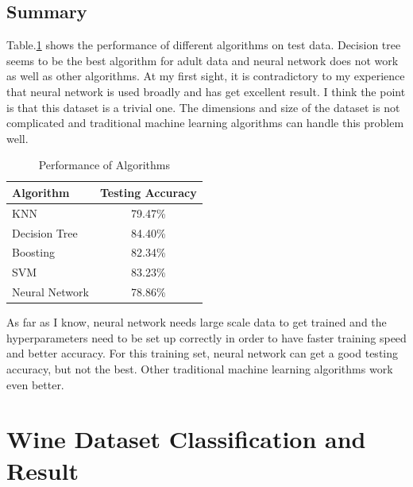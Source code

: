 \documentclass[11pt]{article}
\begin{document}
\subsection{Summary}
Table.\ref{tab:adult} shows the performance of different algorithms on test data. Decision tree seems to be the best algorithm for adult data and neural network does not work as well as other algorithms. At my first sight, it is contradictory to my experience that neural network is used broadly and has get excellent result. I think the point is that this dataset is a trivial one. The dimensions and size of the dataset is not complicated and traditional machine learning algorithms can handle this problem well.
\begin{table}[h!]
  \begin{center}
    \caption{Performance of Algorithms}
    \label{tab:adult}
    \begin{tabular}{l|c}
      \textbf{Algorithm} & \textbf{Testing Accuracy}\\
      \hline
      KNN & 79.47\%\\
      Decision Tree & 84.40\%\\
      Boosting & 82.34\%\\
      SVM & 83.23\% \\
      Neural Network & 78.86\%\\
    \end{tabular}
  \end{center}
\end{table}
As far as I know, neural network needs large scale data to get trained and the hyperparameters need to be set up correctly in order to have faster training speed and better accuracy. For this training set, neural network can get a good testing accuracy, but not the best. Other traditional machine learning algorithms work even better.  
\section{Wine Dataset Classification and Result}
\end{document}
